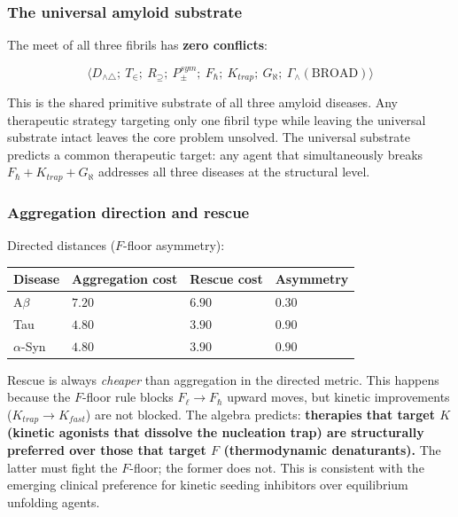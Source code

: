 \documentclass[10pt,a4paper]{article}
\begin{document}
\subsubsection{The universal amyloid substrate}

The meet of all three fibrils has \textbf{zero conflicts}:

\[\langle D_{\wedge\triangle};\ T_\in;\ R_\supseteq;\ P_\pm^{sym};\ F_\hbar;\ K_{trap};\ G_\aleph;\ \Gamma_\wedge(\text{BROAD}) \rangle\]

This is the shared primitive substrate of all three amyloid diseases. Any therapeutic strategy targeting only one fibril type while leaving the universal substrate intact leaves the core problem unsolved. The universal substrate predicts a common therapeutic target: any agent that simultaneously breaks $F_\hbar + K_{trap} + G_\aleph$ addresses all three diseases at the structural level.

\subsubsection{Aggregation direction and rescue}

Directed distances ($F$-floor asymmetry):

\begin{table}[htbp]
\centering
\small
{}
\begin{tabularx}{\textwidth}{>{\centering\arraybackslash}X >{\centering\arraybackslash}X >{\centering\arraybackslash}X >{\centering\arraybackslash}X}
\toprule
\rowcolor{gray!25}\textbf{Disease} & \textbf{Aggregation cost} & \textbf{Rescue cost} & \textbf{Asymmetry} \\
\midrule
\rowcolors{1}{white}{gray!10}
A$\beta$ & $7.20$ & $6.90$ & $0.30$ \\
Tau & $4.80$ & $3.90$ & $0.90$ \\
$\alpha$-Syn & $4.80$ & $3.90$ & $0.90$ \\
\bottomrule
\end{tabularx}
\end{table}

Rescue is always \emph{cheaper} than aggregation in the directed metric. This happens because the $F$-floor rule blocks $F_\ell \to F_\hbar$ upward moves, but kinetic improvements ($K_{trap} \to K_{fast}$) are not blocked. The algebra predicts: \textbf{therapies that target $K$ (kinetic agonists that dissolve the nucleation trap) are structurally preferred over those that target $F$ (thermodynamic denaturants).} The latter must fight the $F$-floor; the former does not. This is consistent with the emerging clinical preference for kinetic seeding inhibitors over equilibrium unfolding agents.
\end{document}
